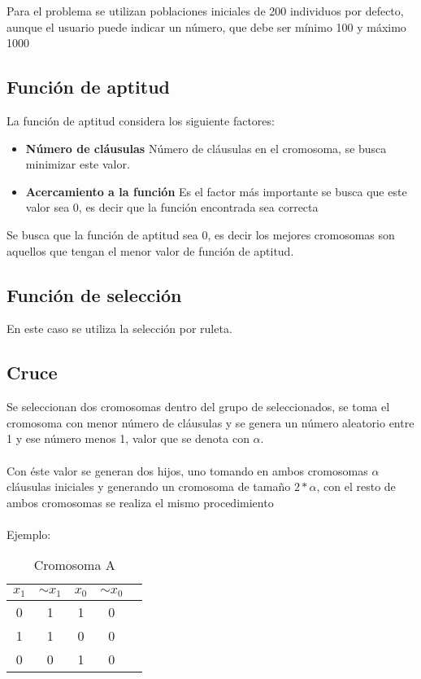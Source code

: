 \documentclass[a4paper]{article}
\begin{document}
Para el problema se utilizan poblaciones iniciales de 200 individuos por defecto, aunque el usuario puede indicar un número, que debe ser mínimo 100 y máximo 1000

\subsection{Función de aptitud}

La función de aptitud considera los siguiente factores:

\begin{itemize}
	\item \textbf{Número de cláusulas} Número de cláusulas en el cromosoma, se busca minimizar este valor.
	\item \textbf{Acercamiento a la función} Es el factor más importante se busca que este valor sea 0, es decir que la función encontrada sea correcta
\end{itemize}

Se busca que la función de aptitud sea 0, es decir los mejores cromosomas son aquellos que tengan el menor valor de función de aptitud.

\subsection{Función de selección}

En este caso se utiliza la selección por ruleta.

\subsection{Cruce}

Se seleccionan dos cromosomas dentro del grupo de seleccionados, se toma el cromosoma con menor número de cláusulas y se genera un número aleatorio entre 1 y ese número menos 1, valor que se denota con $\alpha$.
\\\\
Con éste valor se generan dos hijos, uno tomando en ambos cromosomas $\alpha$ cláusulas iniciales y generando un cromosoma de tamaño $2*\alpha$, con el resto de ambos cromosomas se realiza el mismo procedimiento
\\\\
Ejemplo:

\begin{table}[H]
	\centering
	\caption{Cromosoma A}
	\begin{tabular}{|c | c | c|  c|  c|}
		\hline
		$x_1$ & $ \sim{x_1}$ & $x_0$ & $ \sim{x_0}$\\
		\hline
		0 & 1& 1 & 0\\
		\hline
		1 & 1& 0 & 0\\
		\hline
		0 & 0& 1 & 0\\
		\hline
	\end{tabular}
\end{table}
\end{document}
